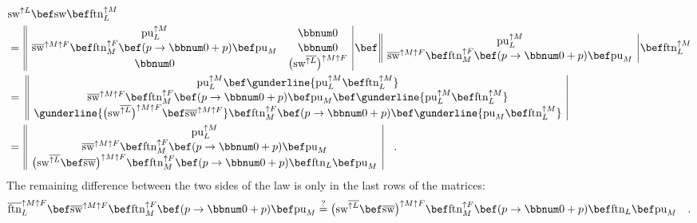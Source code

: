 \begin{align*}
 & \text{sw}^{\uparrow L}\bef\text{sw}\bef\text{ftn}_{L}^{\uparrow M}\\
 & =\,\begin{array}{||cc|}
\text{pu}_{L}^{\uparrow M} & \bbnum 0\\
\overline{\text{sw}}^{\uparrow M\uparrow F}\bef\text{ftn}_{M}^{\uparrow F}\bef(p\rightarrow\bbnum 0+p)\bef\text{pu}_{M} & \bbnum 0\\
\bbnum 0 & \big(\text{sw}^{\overline{\uparrow L}}\big)^{\uparrow M\uparrow F}
\end{array}\,\bef\,\begin{array}{||c|}
\text{pu}_{L}^{\uparrow M}\\
\overline{\text{sw}}^{\uparrow M\uparrow F}\bef\text{ftn}_{M}^{\uparrow F}\bef(p\rightarrow\bbnum 0+p)\bef\text{pu}_{M}
\end{array}\,\bef\text{ftn}_{L}^{\uparrow M}\\
 & =\,\,\begin{array}{||c|}
\text{pu}_{L}^{\uparrow M}\bef\gunderline{\text{pu}_{L}^{\uparrow M}\bef\text{ftn}_{L}^{\uparrow M}}\\
\overline{\text{sw}}^{\uparrow M\uparrow F}\bef\text{ftn}_{M}^{\uparrow F}\bef(p\rightarrow\bbnum 0+p)\bef\text{pu}_{M}\bef\gunderline{\text{pu}_{L}^{\uparrow M}\bef\text{ftn}_{L}^{\uparrow M}}\\
\gunderline{\big(\text{sw}^{\overline{\uparrow L}}\big)^{\uparrow M\uparrow F}\bef\overline{\text{sw}}^{\uparrow M\uparrow F}}\bef\text{ftn}_{M}^{\uparrow F}\bef(p\rightarrow\bbnum 0+p)\bef\gunderline{\text{pu}_{M}\bef\text{ftn}_{L}^{\uparrow M}}
\end{array}\\
 & =\,\begin{array}{||c|}
\text{pu}_{L}^{\uparrow M}\\
\overline{\text{sw}}^{\uparrow M\uparrow F}\bef\text{ftn}_{M}^{\uparrow F}\bef(p\rightarrow\bbnum 0+p)\bef\text{pu}_{M}\\
\big(\text{sw}^{\overline{\uparrow L}}\bef\overline{\text{sw}}\big)^{\uparrow M\uparrow F}\bef\text{ftn}_{M}^{\uparrow F}\bef(p\rightarrow\bbnum 0+p)\bef\text{ftn}_{L}\bef\text{pu}_{M}
\end{array}\quad.
\end{align*}
The remaining difference between the two sides of the law is only
in the last rows of the matrices:
\[
\overline{\text{ftn}}_{L}^{\uparrow M\uparrow F}\bef\overline{\text{sw}}^{\uparrow M\uparrow F}\bef\text{ftn}_{M}^{\uparrow F}\bef(p\rightarrow\bbnum 0+p)\bef\text{pu}_{M}\overset{?}{=}\big(\text{sw}^{\overline{\uparrow L}}\bef\overline{\text{sw}}\big)^{\uparrow M\uparrow F}\bef\text{ftn}_{M}^{\uparrow F}\bef(p\rightarrow\bbnum 0+p)\bef\text{ftn}_{L}\bef\text{pu}_{M}\quad.
\]
